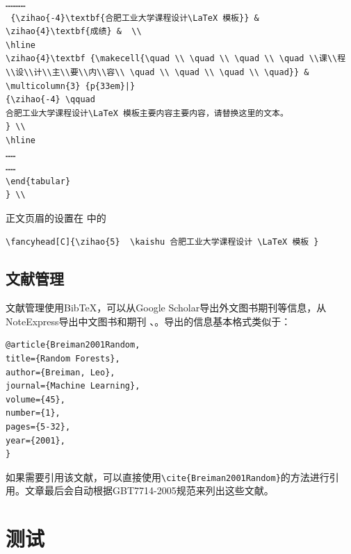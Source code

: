 \begin{lstlisting}
…………
 {\zihao{-4}\textbf{合肥工业大学课程设计\LaTeX 模板}} & \zihao{4}\textbf{成绩} &  \\
\hline
\zihao{4}\textbf {\makecell{\quad \\ \quad \\ \quad \\ \quad \\课\\程\\设\\计\\主\\要\\内\\容\\ \quad \\ \quad \\ \quad \\ \quad}} & \multicolumn{3} {p{33em}|}
{\zihao{-4} \qquad
合肥工业大学课程设计\LaTeX 模板主要内容主要内容，请替换这里的文本。
} \\
\hline
……
……
\end{tabular}
} \\
\end{lstlisting}

正文页眉的设置在 中的
\begin{lstlisting}
\fancyhead[C]{\zihao{5}  \kaishu 合肥工业大学课程设计 \LaTeX 模板 }
\end{lstlisting}

\subsection{文献管理}
文献管理使用Bib\TeX ，可以从Google Scholar导出外文图书期刊等信息，从NoteExpress导出中文图书和期刊\cite{刘运来-199} 、\cite{Breiman2001Random}。导出的信息基本格式类似于：

\begin{lstlisting}
@article{Breiman2001Random,
title={Random Forests},
author={Breiman, Leo},
journal={Machine Learning},
volume={45},
number={1},
pages={5-32},
year={2001},
}
\end{lstlisting}

如果需要引用该文献，可以直接使用\verb|\cite{Breiman2001Random}|的方法进行引用。文章最后会自动根据GBT7714-2005规范来列出这些文献。

\section{测试}

